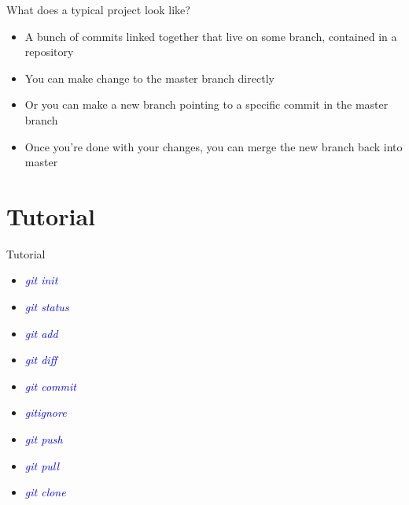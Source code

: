 \documentclass[11pt]{beamer}
\begin{document}
\begin{frame}{What does a typical project look like?}
\begin{itemize}
	\item
	A bunch of commits linked together that live on some branch, contained in a repository
	\item
	You can make change to the master branch directly
	\item
	Or you can make a new branch pointing to a specific commit in the master branch
	\item
	Once you're done with your changes, you can merge the new branch back into master
\end{itemize}
\end{frame}

\section{Tutorial}
\begin{frame}[fragile]{Tutorial}

\begin{itemize}
	\item \textcolor{blue}{\emph{git init}}
	\item \textcolor{blue}{\emph{git status}}
	\item \textcolor{blue}{\emph{git add}}
	\item \textcolor{blue}{\emph{git diff}}
	\item \textcolor{blue}{\emph{git commit}}
	\item \textcolor{blue}{\emph{gitignore}}
	\item \textcolor{blue}{\emph{git push}}
	\item \textcolor{blue}{\emph{git pull}}
	\item \textcolor{blue}{\emph{git clone}}
\end{itemize}
\end{frame}
\end{document}
